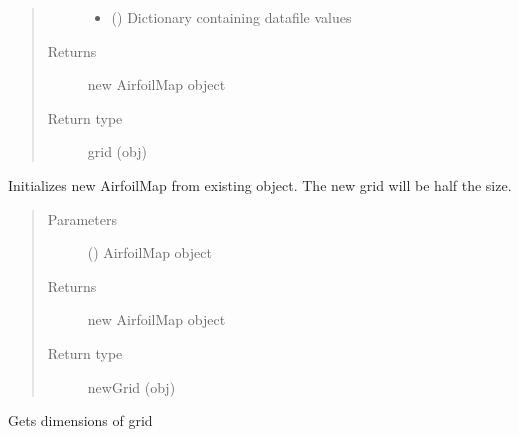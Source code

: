 \documentclass[letterpaper,10pt,english]{sphinxmanual}
\begin{document}
\begin{fulllineitems}
\begin{fulllineitems}
\begin{quote}
\begin{description}
\begin{itemize}
\item {} 
\sphinxAtStartPar
{} () \textendash{} Dictionary containing data\sphinxhyphen{}file values

\end{itemize}

\item[{Returns}] \leavevmode
\sphinxAtStartPar
new AirfoilMap object

\item[{Return type}] \leavevmode
\sphinxAtStartPar
grid (obj)

\end{description}\end{quote}

\end{fulllineitems}


\begin{fulllineitems}
\label{\detokenize{autoapi/AirfoilMap/index:AirfoilMap.AirfoilMap.from_grid}}
\sphinxAtStartPar
Initializes new AirfoilMap from existing object. The new grid will be half the size.
\begin{quote}\begin{description}
\item[{Parameters}] \leavevmode
\sphinxAtStartPar
{} () \textendash{} AirfoilMap object

\item[{Returns}] \leavevmode
\sphinxAtStartPar
new AirfoilMap object

\item[{Return type}] \leavevmode
\sphinxAtStartPar
newGrid (obj)

\end{description}\end{quote}

\end{fulllineitems}


\begin{fulllineitems}
\label{\detokenize{autoapi/AirfoilMap/index:AirfoilMap.AirfoilMap.get_dims}}
\sphinxAtStartPar
Gets dimensions of grid


\end{fulllineitems}
\end{fulllineitems}
\end{document}
